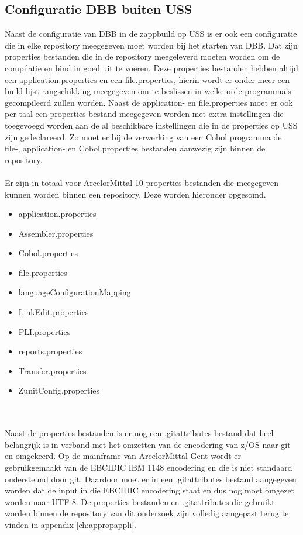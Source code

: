 \subsection{Configuratie DBB buiten USS}
Naast de configuratie van DBB in de zappbuild op USS is er ook een configuratie die in elke repository meegegeven moet worden bij het starten van DBB. Dat zijn properties bestanden die in de repository meegeleverd moeten worden om de compilatie en bind in goed uit te voeren. Deze properties bestanden hebben altijd een application.properties en een file.properties, hierin wordt er onder meer een build lijst rangschikking meegegeven om te beslissen in welke orde programma's gecompileerd zullen worden. Naast de application- en file.properties moet er ook per taal een properties bestand meegegeven worden met extra instellingen die toegevoegd worden aan de al beschikbare instellingen die in de properties op USS zijn gedeclareerd. Zo moet er bij de verwerking van een Cobol programma de file-, application- en Cobol.properties bestanden aanwezig zijn binnen de repository. 
\\ \\
Er zijn in totaal voor ArcelorMittal 10 properties bestanden die meegegeven kunnen worden binnen een repository. Deze worden hieronder opgesomd.
\begin{multicols}{2}
    \begin{itemize}
        \item application.properties
        \item Assembler.properties
        \item Cobol.properties
        \item file.properties
        \item languageConfigurationMapping
        \item LinkEdit.properties
        \item PLI.properties
        \item reports.properties
        \item Transfer.properties
        \item ZunitConfig.properties
    \end{itemize}
\end{multicols}
\\ \\
Naast de properties bestanden is er nog een .gitattributes bestand dat heel belangrijk is in verband met het omzetten van de encodering van z/OS naar git en omgekeerd. Op de mainframe van ArcelorMittal Gent wordt er gebruikgemaakt van de EBCIDIC IBM 1148 encodering en die is niet standaard ondersteund door git. Daardoor moet er in een .gitattributes bestand aangegeven worden dat de input in die EBCIDIC encodering staat en dus nog moet omgezet worden naar UTF-8. De properties bestanden en .gitattributes die gebruikt worden binnen de repository van dit onderzoek zijn volledig aangepast terug te vinden in appendix \ref{ch:appropappli}. 

